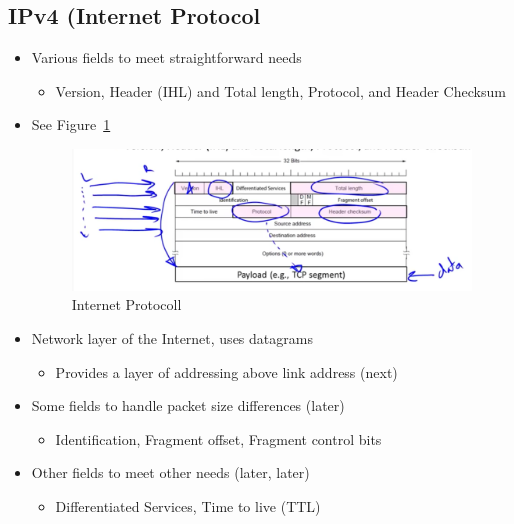 \documentclass[12pt]{ctexart}   %
\begin{document}
	\subsection{IPv4 (Internet Protocol}
	\begin{itemize}
		\item Various fields to meet straightforward needs
		\begin{itemize}
			\item Version, Header (IHL) and Total length, Protocol, and Header Checksum
		\end{itemize}
		\item See Figure~\ref{fig:4-3-3}
		
		\begin{figure}[h!] %
		\centering
		 \includegraphics[scale=0.7]{images/4-3-3}
		\caption{ Internet Protocoll }
		 \label{fig:4-3-3}
		 \end{figure}
		 
		 \item Network layer of the Internet, uses datagrams
		 \begin{itemize}
		 	\item Provides a layer of addressing above link address (next)
		 \end{itemize}
		 
		 \item Some fields to handle packet size differences (later)
		 \begin{itemize}
		 	\item Identification, Fragment offset, Fragment control bits
		 \end{itemize}
		 
		 \item Other fields to meet other needs (later, later)
		\begin{itemize}
			\item Differentiated Services, Time to live (TTL)
		\end{itemize}
	\end{itemize}
	
	
\end{document}

